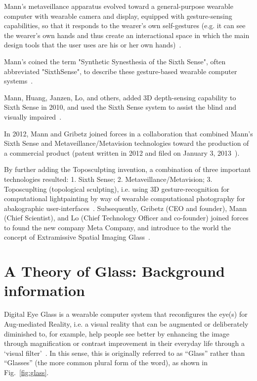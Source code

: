 Mann's metaveillance apparatus evolved toward a general-purpose wearable computer with wearable camera and display, equipped with gesture-sensing capabilities, so that it responds to the wearer's own self-gestures (e.g. it can see the wearer's own hands and thus create an interactional space in which the main design tools that the user uses are his or her own hands)~\cite{mannieeecomputer}.

Mann's coined the term "Synthetic Synesthesia of the Sixth Sense", often abbreviated "SixthSense", to describe these gesture-based wearable computer systems~\cite{cyborg, geary2002body}.

Mann, Huang, Janzen, Lo, and others, added 3D depth-sensing capability to Sixth Sense in 2010, and used the Sixth Sense system to assist the blind and visually impaired~\cite{mann2011blind}.

In 2012, Mann and Gribetz joined forces in a collaboration that combined Mann's Sixth Sense and Metaveillance/Metavision technologies toward the production of a commercial product (patent written in 2012 and filed on January 3, 2013~\cite{patentmetadepth}).

By further adding the Toposculpting invention, a combination of three important technologies resulted:
1. Sixth Sense;
2. Metaveillance/Metavision;
3. Toposcuplting (topological sculpting), i.e. using 3D gesture-recognition for computational lightpainting by way of wearable computational photography for abakographic user-interfaces~\cite{patentmetabakography}. Subsequently, Gribetz (CEO and founder), Mann (Chief Scientist), and Lo (Chief Technology Officer and co-founder) joined forces to found the new company Meta Company, and introduce to the world the concept of Extramissive Spatial Imaging Glass~\cite{gribetz2014extramissive}. 

\section{A Theory of Glass: Background information}

Digital Eye Glass is a wearable computer system that reconfigures the eye(s)
for Aug-mediated Reality, i.e. a visual reality that can be augmented or
deliberately diminished to, for example, help people see better by enhancing the image through 
magnification or contrast improvement in their everyday life through a `visual 
filter'~\cite{mann1994mediated}. 
In this sense, this is originally referred to as ``Glass'' rather than ``Glasses'' (the more common plural 
form of the word), as shown in Fig.~\ref{fig:glass}. 


